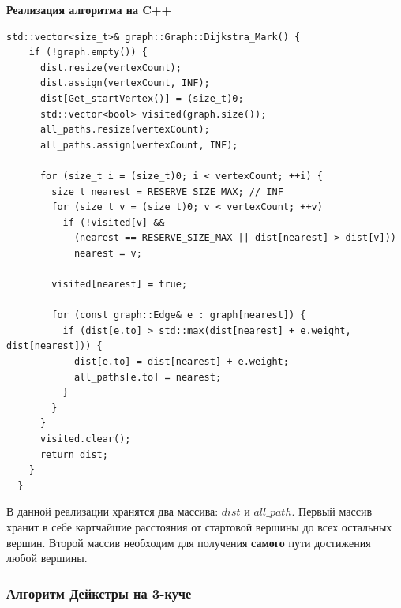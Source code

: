 \begin{text}
\begin{center}
\textbf{Реализация алгоритма на C++}
\end{center}

\begin{lstlisting}[breaklines=true]
std::vector<size_t>& graph::Graph::Dijkstra_Mark() {
    if (!graph.empty()) {
      dist.resize(vertexCount);
      dist.assign(vertexCount, INF);
      dist[Get_startVertex()] = (size_t)0;
      std::vector<bool> visited(graph.size());
      all_paths.resize(vertexCount);
      all_paths.assign(vertexCount, INF);

      for (size_t i = (size_t)0; i < vertexCount; ++i) {
        size_t nearest = RESERVE_SIZE_MAX; // INF
        for (size_t v = (size_t)0; v < vertexCount; ++v)
          if (!visited[v] &&
            (nearest == RESERVE_SIZE_MAX || dist[nearest] > dist[v]))
            nearest = v;

        visited[nearest] = true;

        for (const graph::Edge& e : graph[nearest]) {
          if (dist[e.to] > std::max(dist[nearest] + e.weight, dist[nearest])) {
            dist[e.to] = dist[nearest] + e.weight;
            all_paths[e.to] = nearest;
          }
        }
      }
      visited.clear();
      return dist;
    }
  }
\end{lstlisting}

В данной реализации хранятся два массива: $dist$ и $all\_path$. Первый массив хранит в себе картчайшие расстояния от стартовой вершины до всех остальных вершин. Второй массив необходим для получения \textbf{самого} пути достижения любой вершины.

\newpage

\subsubsection{Алгоритм Дейкстры на 3-куче}


\end{text}
